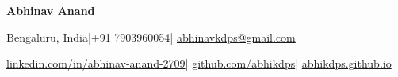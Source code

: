 {\LARGE\bfseries Abhinav Anand}\par
\vspace{3pt}
Bengaluru, India\enspace |\enspace +91 7903960054\enspace |\enspace
\href{mailto:abhinavkdps@gmail.com}{abhinavkdps@gmail.com}\par
\href{https://www.linkedin.com/in/abhinav-anand-2709/}{linkedin.com/in/abhinav-anand-2709}\enspace |\enspace
\href{https://github.com/abhikdps}{github.com/abhikdps}\enspace |\enspace
\href{https://abhikdps.github.io/}{abhikdps.github.io}\par

